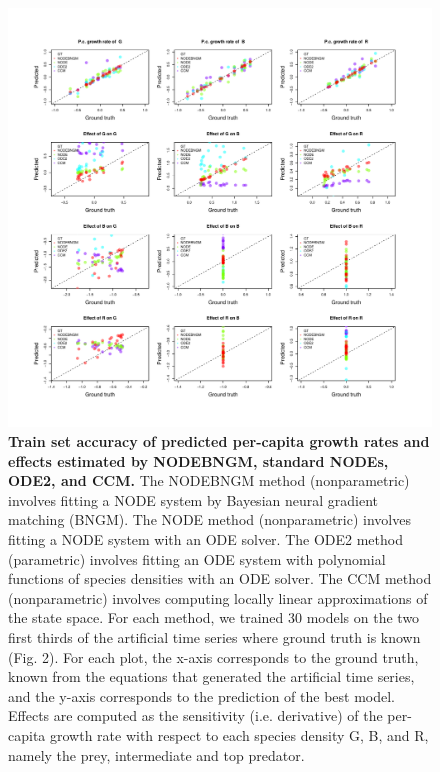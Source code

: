 \documentclass[11pt, oneside]{article}
\begin{document}
\begin{figure}[H]
\includegraphics[width=1\linewidth,page=1]{figures/figures_supplementary.pdf}
\caption{
    \textbf{Train set accuracy of predicted per-capita growth rates and effects estimated by NODEBNGM, standard NODEs, ODE2, and CCM.}
    The NODEBNGM method (nonparametric) involves fitting a NODE system by Bayesian neural gradient matching (BNGM). 
    The NODE method (nonparametric) involves fitting a NODE system with an ODE solver. 
    The ODE2 method (parametric) involves fitting an ODE system with polynomial functions of species densities with an ODE solver. 
    The CCM method (nonparametric) involves computing locally linear approximations of the state space. 
    For each method, we trained 30 models on the two first thirds of the artificial time series where ground truth is known (Fig. 2). 
    For each plot, the x-axis corresponds to the ground truth, known from the equations that generated the artificial time series, and the y-axis corresponds to the prediction of the best model. 
    Effects are computed as the sensitivity (i.e. derivative) of the per-capita growth rate with respect to each species density G, B, and R, namely the prey, intermediate and top predator.
}
\end{figure}
\newpage
\end{document}
